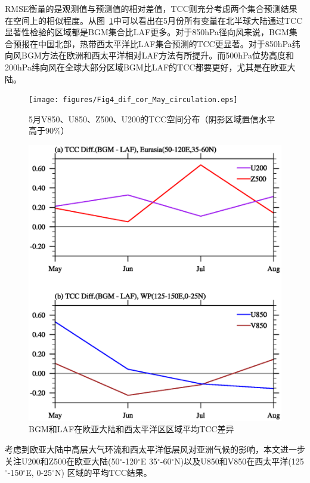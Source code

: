 RMSE衡量的是观测值与预测值的相对差值，TCC则充分考虑两个集合预测结果在空间上的相似程度。从图~\ref{fig:TCC four vari}中可以看出在5月份所有变量在北半球大陆通过TCC显著性检验的区域都是BGM集合比LAF更多。对于850hPa径向风来说，BGM集合预报在中国北部，热带西太平洋比LAF集合预测的TCC更显著。对于850hPa纬向风BGM方法在欧洲和西太平洋相对LAF方法有所提升。而500hPa位势高度和200hPa纬向风在全球大部分区域BGM比LAF的TCC都要更好，尤其是在欧亚大陆。

\begin{figure}[H] %
  \centering
  \texttt{[image: figures/Fig4\_dif\_cor\_May\_circulation.eps]}
  \caption{5月V850、U850、Z500、U200的TCC空间分布（阴影区域置信水平高于90\%）}
  \label{fig:TCC four vari}
\end{figure}

\begin{figure}[H] %
  \centering
  \includegraphics[scale=0.45,trim=1 10 1 16,clip]{figures/Fig5_dif_cor_May_Aug_series.eps}
  \caption{BGM和LAF在欧亚大陆和西太平洋区区域平均TCC差异}
  \label{fig:Tcc eura and wes pac}
\end{figure}

考虑到欧亚大陆中高层大气环流和西太平洋低层风对亚洲气候的影响，本文进一步关注U200和Z500在欧亚大陆(50$^\circ$-120$^\circ$E 35$^\circ$-60$^\circ$N)以及U850和V850在西太平洋(125$^\circ$-150$^\circ$E, 0-25$^\circ$N) 区域的平均TCC结果。

